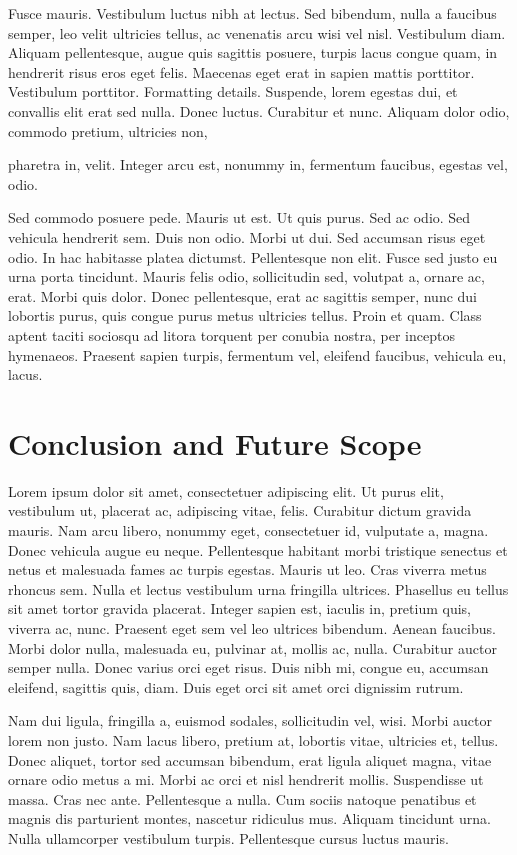 \documentclass[12pt,a4paper,twoside,openright]{report}
\begin{document}
Fusce mauris. Vestibulum luctus nibh at lectus. Sed bibendum, nulla a faucibus semper, leo velit ultricies tellus, ac venenatis arcu wisi vel nisl. Vestibulum diam. Aliquam pellentesque, augue quis sagittis posuere, turpis lacus congue quam, in hendrerit risus eros eget felis. Maecenas eget erat in sapien mattis porttitor. Vestibulum porttitor. Formatting details. Suspende, lorem egestas dui, et convallis elit erat sed nulla. Donec luctus. Curabitur et nunc. Aliquam dolor odio, commodo pretium, ultricies non,

\newpage
pharetra in, velit. Integer arcu est, nonummy in, fermentum faucibus, egestas vel, odio.

Sed commodo posuere pede. Mauris ut est. Ut quis purus. Sed ac odio. Sed vehicula hendrerit sem. Duis non odio. Morbi ut dui. Sed accumsan risus eget odio. In hac habitasse platea dictumst. Pellentesque non elit. Fusce sed justo eu urna porta tincidunt. Mauris felis odio, sollicitudin sed, volutpat a, ornare ac, erat. Morbi quis dolor. Donec pellentesque, erat ac sagittis semper, nunc dui lobortis purus, quis congue purus metus ultricies tellus. Proin et quam. Class aptent taciti sociosqu ad litora torquent per conubia nostra, per inceptos hymenaeos. Praesent sapien turpis, fermentum vel, eleifend faucibus, vehicula eu, lacus.

\cleardoublepage


\chapter{Conclusion and Future Scope}
Lorem ipsum dolor sit amet, consectetuer adipiscing elit. Ut purus elit, vestibulum ut, placerat ac, adipiscing vitae, felis. Curabitur dictum gravida mauris. Nam arcu libero, nonummy eget, consectetuer id, vulputate a, magna. Donec vehicula augue eu neque. Pellentesque habitant morbi tristique senectus et netus et malesuada fames ac turpis egestas. Mauris ut leo. Cras viverra metus rhoncus sem. Nulla et lectus vestibulum urna fringilla ultrices. Phasellus eu tellus sit amet tortor gravida placerat. Integer sapien est, iaculis in, pretium quis, viverra ac, nunc. Praesent eget sem vel leo ultrices bibendum. Aenean faucibus. Morbi dolor nulla, malesuada eu, pulvinar at, mollis ac, nulla. Curabitur auctor semper nulla. Donec varius orci eget risus. Duis nibh mi, congue eu, accumsan eleifend, sagittis quis, diam. Duis eget orci sit amet orci dignissim rutrum.

Nam dui ligula, fringilla a, euismod sodales, sollicitudin vel, wisi. Morbi auctor lorem non justo. Nam lacus libero, pretium at, lobortis vitae, ultricies et, tellus. Donec aliquet, tortor sed accumsan bibendum, erat ligula aliquet magna, vitae ornare odio metus a mi. Morbi ac orci et nisl hendrerit mollis. Suspendisse ut massa. Cras nec ante. Pellentesque a nulla. Cum sociis natoque penatibus et magnis dis parturient montes, nascetur ridiculus mus. Aliquam tincidunt urna. Nulla ullamcorper vestibulum turpis. Pellentesque cursus luctus mauris.
\end{document}

